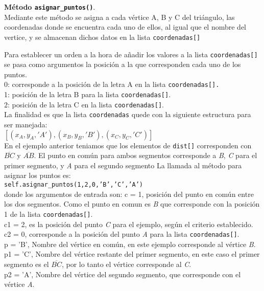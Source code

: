 \textbf{Método \texttt{asignar\_puntos()}}.\\
Mediante este método se asigna a cada vértice A, B y C del triángulo, las coordenadas donde se encuentra cada uno de ellos, al igual que el nombre del vertice, y se almacenan dichos datos en la lista \texttt{coordenadas[]}

Para establecer un orden a la hora de añadir los valores a la lista \texttt{coordenadas[]} se pasa como argumentos la posición a la que corresponden cada uno de los puntos.\\
0: corresponde a la posición de la letra A en la lista \texttt{coordenadas[].}\\
1: posición de la letra B para la lista \texttt{coordenadas[]}.\\
2: posición de la letra C en la lista \texttt{coordenadas[]}.\\

La finalidad es que la lista \texttt{coordenadas} quede con la siguiente estructura para ser 
manejada:\\

$[(x_{A},y_{A},'A'),(x_{B},y_{B},'B'),(x_{C},y_{C},'C')]$\\

En el ejemplo anterior teniamos que los elementos de \texttt{dist[]} corresponden con $\overline{BC}$ y $\overline{AB}$. El punto en común para ambos segmentos corresponde a \textit{\textit{B}}, \textit{C} para el primer segmento, y \textit{A} para el segundo segmento
La llamada al método para asignar los puntos es:\\
\texttt{self.asignar\_puntos(1,2,0,'B','C','A')}\\
donde los argumentos de entrada son:
c = 1, posición del punto en común entre los dos segmentos. Como el punto en comun es \textit{B} que corresponde con la posición 1 de la lista \texttt{coordenadas[]}.\\
c1 = 2, es la posición del punto \textit{C} para el ejemplo, según el criterio establecido.\\
c2 = 0, corresponde a la posición del punto \textit{A} para la lista \texttt{coordenadas[]}.\\
p = 'B', Nombre del vértice en común, en este ejemplo corresponde al vértice \textit{B}.\\
p1 = 'C', Nombre del vértice restante del primer segmento, en este caso el primer segmento es el $\overline{BC}$, por lo tanto el vértice corresponde al \textit{C}.\\
p2 = 'A', Nombre del vértice del segundo segmento, que corresponde con el vértice \textit{A}.\\

